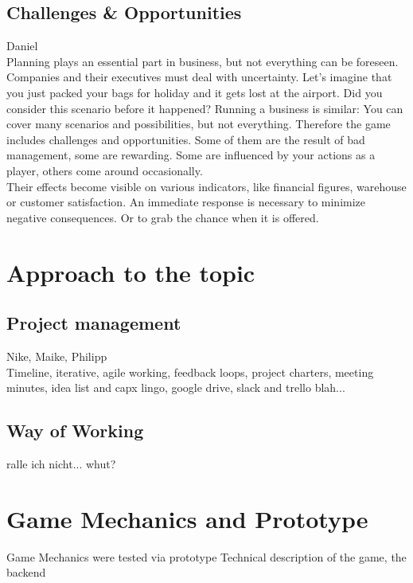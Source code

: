 \documentclass[11pt,titlepage,oneside,openany]{book}
\begin{document}
\section{Challenges \& Opportunities}
Daniel \\
Planning plays an essential part in business, but not everything can be foreseen. Companies and their executives must deal with uncertainty. Let's imagine that you just packed your bags for holiday and it gets lost at the airport. Did you consider this scenario before it happened? Running a business is similar: You can cover many scenarios and possibilities, but not everything. Therefore the game includes challenges and opportunities. Some of them are the result of bad management, some are rewarding. Some are influenced by your actions as a player, others come around occasionally.\\
Their effects become visible on various indicators, like financial figures, warehouse or customer satisfaction. An immediate response is necessary to minimize negative consequences. Or to grab the chance when it is offered. 

\chapter{Approach to the topic}
\section{Project management}
Nike, Maike, Philipp \\
Timeline, iterative, agile working, feedback loops, project charters, meeting minutes, idea list and capx lingo, google drive, slack and trello blah... 
\section{Way of Working}
ralle ich nicht... whut?

\chapter{Game Mechanics and Prototype}
\label{cha:alg}
Game Mechanics were tested via prototype
Technical description of the game, the backend








\end{document}

